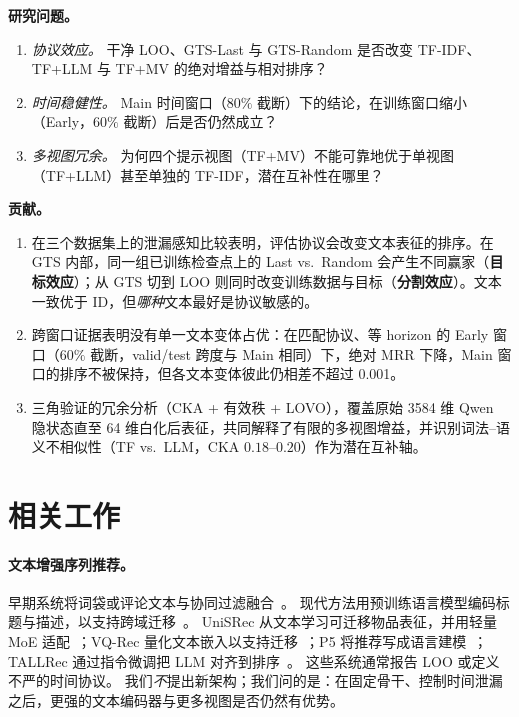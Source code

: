 \documentclass[sigconf,natbib=true,anonymous]{acmart}
\newcommand{\tfidf}{\textsc{TF-IDF}\xspace}
\newcommand{\tfllm}{\textsc{TF+LLM}\xspace}
\newcommand{\tfmv}{\textsc{TF+MV}\xspace}
\begin{document}
\noindent\textbf{研究问题。}
\nopagebreak
\begin{enumerate}[leftmargin=*,itemsep=1pt,topsep=4pt]
\item[\textbf{RQ1}] \emph{协议效应。}
干净 LOO、GTS-Last 与 GTS-Random 是否改变 \tfidf、\tfllm 与 \tfmv 的绝对增益与相对排序？
\item[\textbf{RQ2}] \emph{时间稳健性。}
Main 时间窗口（$80\%$ 截断）下的结论，在训练窗口缩小（Early，$60\%$ 截断）后是否仍然成立？
\item[\textbf{RQ3}] \emph{多视图冗余。}
为何四个提示视图（\tfmv）不能可靠地优于单视图（\tfllm）甚至单独的 \tfidf，潜在互补性在哪里？
\end{enumerate}

\noindent\textbf{贡献。}
\nopagebreak
\begin{enumerate}[leftmargin=*,itemsep=1pt,topsep=4pt]
\item 在三个数据集上的泄漏感知比较表明，评估协议会改变文本表征的排序。在 GTS 内部，同一组已训练检查点上的 Last vs.\ Random 会产生不同赢家（\textbf{目标效应}）；从 GTS 切到 LOO 则同时改变训练数据与目标（\textbf{分割效应}）。文本一致优于 ID，但\emph{哪种}文本最好是协议敏感的。
\item 跨窗口证据表明没有单一文本变体占优：在匹配协议、等 horizon 的 Early 窗口（$60\%$ 截断，valid/test 跨度与 Main 相同）下，绝对 MRR 下降，Main 窗口的排序不被保持，但各文本变体彼此仍相差不超过 0.001。
\item 三角验证的冗余分析（CKA + 有效秩 + LOVO），覆盖原始 3584 维 Qwen 隐状态直至 64 维白化后表征，共同解释了有限的多视图增益，并识别词法--语义不相似性（TF vs.\ LLM，CKA $0.18$--$0.20$）作为潜在互补轴。
\end{enumerate}

\section{相关工作}
\label{sec:related}

\paragraph{文本增强序列推荐。}
早期系统将词袋或评论文本与协同过滤融合~\cite{wang2015cdl,salton1988termweighting}。
现代方法用预训练语言模型编码标题与描述，以支持跨域迁移~\cite{hou2022unisrec,hou2023vqrec,geng2022p5,bao2023tallrec}。
UniSRec 从文本学习可迁移物品表征，并用轻量 MoE 适配~\cite{hou2022unisrec}；VQ-Rec 量化文本嵌入以支持迁移~\cite{hou2023vqrec}；P5 将推荐写成语言建模~\cite{geng2022p5}；TALLRec 通过指令微调把 LLM 对齐到排序~\cite{bao2023tallrec}。
这些系统通常报告 LOO 或定义不严的时间协议。
我们\emph{不}提出新架构；我们问的是：在固定骨干、控制时间泄漏之后，更强的文本编码器与更多视图是否仍然有优势。
\end{document}
